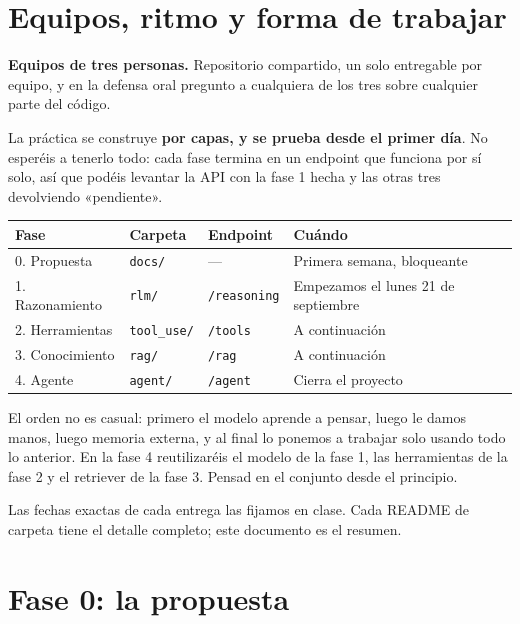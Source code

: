 \documentclass[11pt,a4paper]{article}
\newcommand{\code}[1]{{\small\texttt{#1}}}
\newcommand{\file}[1]{{\small\texttt{\textcolor{arcablue}{#1}}}}
\begin{document}
\section{Equipos, ritmo y forma de trabajar}

\textbf{Equipos de tres personas.} Repositorio compartido, un solo entregable por equipo, y
en la defensa oral pregunto a cualquiera de los tres sobre cualquier parte del código.

La práctica se construye \textbf{por capas, y se prueba desde el primer día}. No esperéis a
tenerlo todo: cada fase termina en un endpoint que funciona por sí solo, así que podéis
levantar la API con la fase 1 hecha y las otras tres devolviendo «pendiente».

\begin{center}
\small
\begin{tabularx}{\textwidth}{@{}l l l X@{}}
\toprule
\textbf{Fase} & \textbf{Carpeta} & \textbf{Endpoint} & \textbf{Cuándo} \\
\midrule
0. Propuesta      & \file{docs/}     & ---                & Primera semana, bloqueante \\
1. Razonamiento   & \file{rlm/}      & \code{/reasoning}  & Empezamos el lunes 21 de septiembre \\
2. Herramientas   & \file{tool\_use/}& \code{/tools}      & A continuación \\
3. Conocimiento   & \file{rag/}      & \code{/rag}        & A continuación \\
4. Agente         & \file{agent/}    & \code{/agent}      & Cierra el proyecto \\
\bottomrule
\end{tabularx}
\end{center}

El orden no es casual: primero el modelo aprende a pensar, luego le damos manos, luego memoria
externa, y al final lo ponemos a trabajar solo usando todo lo anterior. En la fase 4
reutilizaréis el modelo de la fase 1, las herramientas de la fase 2 y el retriever de la
fase 3. Pensad en el conjunto desde el principio.

Las fechas exactas de cada entrega las fijamos en clase. Cada README de carpeta tiene el
detalle completo; este documento es el resumen.

\section{Fase 0: la propuesta}
\end{document}

